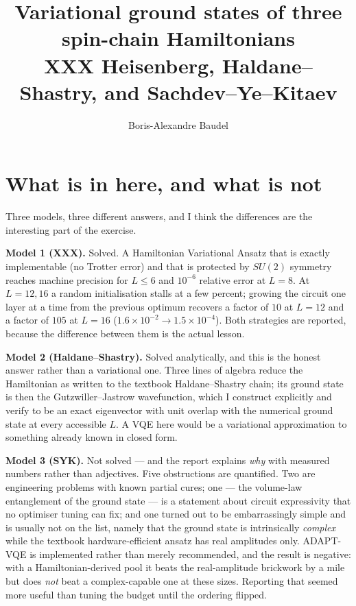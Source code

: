 \documentclass[10pt,a4paper]{article}
\title{\vspace{-1.6cm}\textbf{Variational ground states of three spin-chain
Hamiltonians}\\[2pt]
\large XXX Heisenberg, Haldane--Shastry, and Sachdev--Ye--Kitaev}
\author{Boris-Alexandre Baudel}
\date{}
\begin{document}
\maketitle
\vspace{-1.0cm}

\section*{What is in here, and what is not}

Three models, three different answers, and I think the differences are the
interesting part of the exercise.

\textbf{Model 1 (XXX).} Solved. A Hamiltonian Variational Ansatz that is
exactly implementable (no Trotter error) and that is protected by $SU(2)$
symmetry reaches machine precision for $L \le 6$ and $10^{-6}$ relative error
at $L=8$. At $L=12,16$ a random initialisation stalls at a
few percent; growing the circuit one layer at a time from the previous optimum
recovers a factor of $10$ at $L=12$ and a factor of $105$ at $L=16$
($1.6\times10^{-2} \to 1.5\times10^{-4}$). Both strategies are reported,
because the difference between them is the actual lesson.

\textbf{Model 2 (Haldane--Shastry).} Solved analytically, and this is the
honest answer rather than a variational one. Three lines of algebra reduce the
Hamiltonian as written to the textbook Haldane--Shastry chain; its ground state
is then the Gutzwiller--Jastrow wavefunction, which I construct explicitly and
verify to be an exact eigenvector with unit overlap with the numerical ground
state at every accessible $L$. A VQE here would be a variational
approximation to something already known in closed form.

\textbf{Model 3 (SYK).} Not solved --- and the report explains \emph{why}
with measured numbers rather than adjectives. Five obstructions are quantified.
Two are engineering problems with known partial cures; one --- the volume-law
entanglement of the ground state --- is a statement about circuit expressivity
that no optimiser tuning can fix; and one turned out to be embarrassingly
simple and is usually not on the list, namely that the ground state is
intrinsically \emph{complex} while the textbook hardware-efficient ansatz has
real amplitudes only. ADAPT-VQE is implemented rather than merely
recommended, and the result is negative: with a Hamiltonian-derived pool it
beats the real-amplitude brickwork by a mile but does \emph{not} beat a
complex-capable one at these sizes. Reporting that seemed more useful than
tuning the budget until the ordering flipped.
\end{document}
